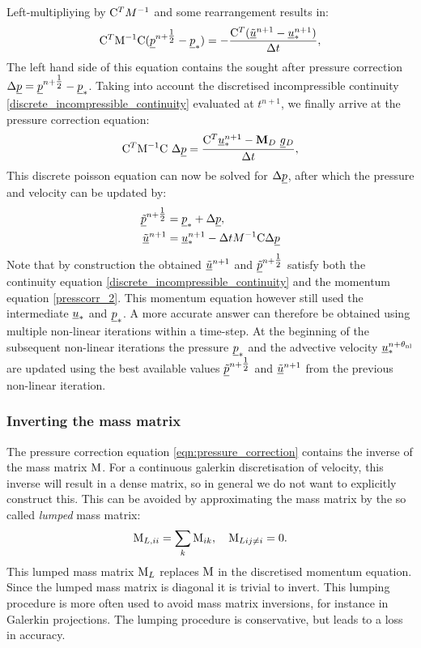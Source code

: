 Left-multipliying by $\mathrm{C}^TM^{-1}$ and 
some rearrangement results in:
\begin{equation*}
  \mathrm{C}^T \mathrm{M^{-1}}\mathrm{C} ( \underline{p}^{n+\tfrac 12} -  \underline{p}_*)
  =-\frac{\mathrm{C}^T  ({\underline{\tilde u}^{n+1}-\underline{u}_*^{n+1}})}{\Delta t},
\end{equation*}
The left hand side of this equation contains the sought after pressure 
correction $\Delta\underline{p}=\underline{p}^{n+\tfrac 12}-\underline{p}_*$. 
Taking into account the discretised incompressible continuity 
\eqref{discrete_incompressible_continuity} evaluated at 
$t^{n+1}$, we finally arrive at the pressure correction equation:
\begin{equation}
 \mathrm{C}^T \mathrm{M^{-1}}\mathrm{C}~\Delta\underline{p}
   =\frac{ \mathrm{C}^T \underline{u}_*^{n+1}-{\mbox{\boldmath$\mathrm{M}$}}_D ~\underline{g}{}_D}{\Delta t},
   \label{eqn:pressure_correction}
\end{equation}
This discrete poisson equation can now be solved 
for $\Delta\underline{p}$, after which the pressure and velocity can 
be updated by:
\begin{equation*}
\begin{split}
  \underline{\tilde p}^{n+\tfrac 12} &= \underline{p}_* + \Delta\underline{p}, \\
  \underline{\tilde u}^{n+1} &= \underline{u}_*^{n+1}
  -\Delta t  M^{-1} \mathrm{C} \Delta\underline{p}
\end{split}
\end{equation*}
Note that by construction the obtained $\underline{\tilde u}^{n+1}$ and 
$\underline{\tilde p}^{n+\tfrac 12}$ satisfy both the continuity equation
\eqref{discrete_incompressible_continuity} and the momentum equation
\eqref{presscorr_2}. This momentum equation however still used
the intermediate $\underline{u}_*$ and $\underline{p}_*$.
A more accurate answer can therefore 
be obtained using multiple non-linear iterations within a 
time-step. At the beginning of the subsequent non-linear iterations
the pressure $\underline{p}_*$ and the advective velocity 
$\underline{u}_*^{n+\theta_{\mathrm{nl}}}$ are updated using the best available values
$\underline{\tilde p}^{n+\tfrac 12}$ and $\underline{\tilde u}^{n+1}$ from the previous 
non-linear iteration.

\subsubsection{Inverting the mass matrix}
\label{Sect:ND_cg_mass_lumping}
The pressure correction equation \eqref{eqn:pressure_correction} contains
the inverse of the mass matrix $\mathrm{M}$. For a continuous galerkin
discretisation of velocity, this inverse will result in a dense 
matrix, so in general we do not want to explicitly construct 
this. This can be avoided by approximating the mass matrix by the 
so called \emph{lumped} mass matrix:
\begin{equation*}
  \mathrm{M}_{L,ii}=\sum_k \mathrm{M}_{ik},\quad \mathrm{M}_{Lij\neq i}=0.
\end{equation*}
This lumped mass matrix $\mathrm{M}_L$ replaces $\mathrm{M}$ in the 
discretised momentum equation. Since the lumped mass matrix is 
diagonal it is trivial to invert. This lumping procedure is more 
often used to avoid mass matrix inversions, for instance in 
Galerkin projections. The lumping procedure is conservative, 
but leads to a loss in accuracy.

